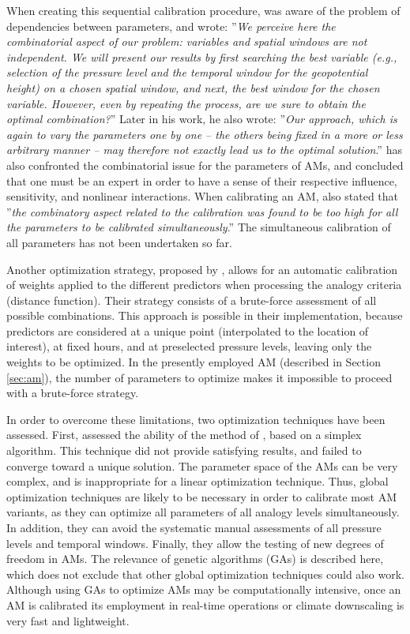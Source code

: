 \documentclass{ametsoc}
\begin{document}
When creating this sequential calibration procedure, \citet{Bontron2004} was aware of the problem of dependencies between parameters, and wrote: ''\textit{We perceive here the combinatorial aspect of our problem: variables and spatial windows are not independent. We will present our results by first searching the best variable (e.g., selection of the pressure level and the temporal window for the geopotential height) on a chosen spatial window, and next, the best window for the chosen variable. However, even by repeating the process, are we sure to obtain the optimal combination?}'' Later in his work, he also wrote: ''\textit{Our approach, which is again to vary the parameters one by one -- the others being fixed in a more or less arbitrary manner -- may therefore not exactly lead us to the optimal solution}.'' \citet{Bliefernicht2010} has also confronted the combinatorial issue for the parameters of AMs, and concluded that one must be an expert in order to have a sense of their respective influence, sensitivity, and nonlinear interactions. When calibrating an AM, \citet{BenDaoud2010} also stated that ''\textit{the combinatory aspect related to the calibration was found to be too high for all the parameters to be calibrated simultaneously}.'' The simultaneous calibration of all parameters has not been undertaken so far. 

Another optimization strategy, proposed by \citet{Junk2015}, allows for an automatic calibration of weights applied to the different predictors when processing the analogy criteria (distance function). Their strategy consists of a brute-force assessment of all possible combinations. This approach is possible in their implementation, because predictors are considered at a unique point (interpolated to the location of interest), at fixed hours, and at preselected pressure levels, leaving only the weights to be optimized. In the presently employed AM (described in Section \ref{sec:am}), the number of parameters to optimize makes it impossible to proceed with a brute-force strategy.

In order to overcome these limitations, two optimization techniques have been assessed. First, \citet{Horton2012a} assessed the ability of the method of \citet{Nelder1965a}, based on a simplex algorithm. This technique did not provide satisfying results, and failed to converge toward a unique solution. The parameter space of the AMs can be very complex, and is inappropriate for a linear optimization technique. Thus, global optimization techniques are likely to be necessary in order to calibrate most AM variants, as they can optimize all parameters of all analogy levels simultaneously. In addition, they can avoid the systematic manual assessments of all pressure levels and temporal windows. Finally, they allow the testing of new degrees of freedom in AMs. The relevance of genetic algorithms (GAs) is described here, which does not exclude that other global optimization techniques could also work. Although using GAs to optimize AMs may be computationally intensive, once an AM is calibrated its employment in real-time operations or climate downscaling is very fast and lightweight.
\end{document}
